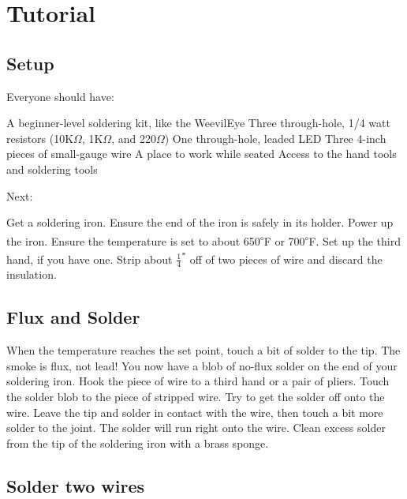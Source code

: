 \documentclass[12pt]{article}
\newcommand{\degs}[1]{\textsuperscript{$\circ$}#1}
\begin{document}
\newpage
\section{Tutorial}

\subsection{Setup}

Everyone should have:

\begin{enumerate}
\+ A beginner-level soldering kit, like the WeevilEye
\+ Three through-hole, 1/4 watt resistors (10K$\Omega$, 1K$\Omega$, and 220$\Omega$)
\+ One through-hole, leaded LED
\+ Three 4-inch pieces of small-gauge wire
\+ A place to work while seated
\+ Access to the hand tools and soldering tools
\end{enumerate}

Next:

Get a soldering iron. Ensure the end of the iron is safely in its holder. Power up the iron. Ensure the temperature is set to about 650\degs{F} or 700\degs{F}.  Set up the third hand, if you have one. Strip about $\frac{1}{4}$\textsuperscript{\texttt{"}} off of two pieces of wire and discard the insulation.

\subsection{Flux and Solder}

When the temperature reaches the set point, touch a bit of solder to the tip. The smoke is flux, not lead! You now have a blob of no-flux solder on the end of your soldering iron. Hook the piece of wire to a third hand or a pair of pliers. Touch the solder blob to the piece of stripped wire. Try to get the solder off onto the wire. Leave the tip and solder in contact with the wire, then touch a bit more solder to the joint. The solder will run right onto the wire. Clean excess solder from the tip of the soldering iron with a brass sponge.

\subsection{Solder two wires}
\end{document}
